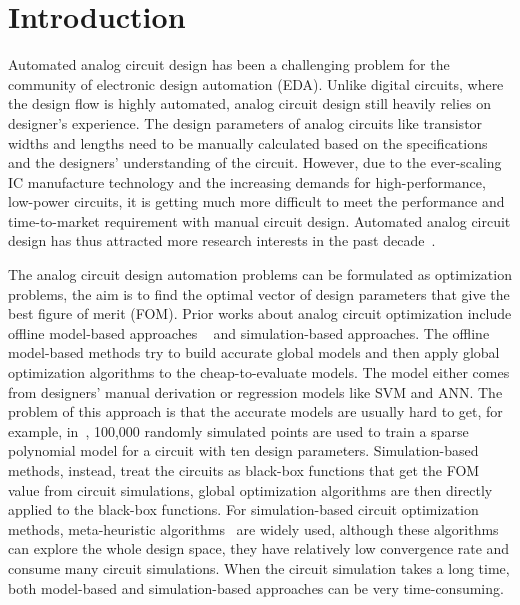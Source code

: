 \section{Introduction}

Automated analog circuit design has been a challenging problem for the
community of electronic design automation (EDA). Unlike digital circuits, where
the design flow is highly automated, analog circuit design still
heavily relies on designer's experience. The design parameters of analog circuits like
transistor widths and lengths need to be manually calculated based on the
specifications and the designers' understanding of the circuit. However, due to
the ever-scaling IC manufacture technology and the increasing demands for
high-performance, low-power circuits, it is getting much more difficult to meet
the performance and time-to-market requirement with manual circuit design.
Automated analog circuit design has thus attracted more research interests in
the past decade~\cite{rutenbar2007hierarchical}.

The analog circuit design automation problems can be formulated as optimization
problems, the aim is to find the optimal vector of design parameters that give
the best figure of merit (FOM). Prior works about analog circuit optimization
include offline model-based approaches
~\cite{colleran2003optimization,daems2003simulation,wang2014enabling} and
simulation-based approaches. The offline model-based methods try to build
accurate global models and then apply global optimization algorithms to the
cheap-to-evaluate models. The model either comes from designers' manual
derivation or regression models like SVM and ANN. The problem of this approach
is that the accurate models are usually hard to get, for example,
in~\cite{wang2014enabling}, 100,000 randomly simulated points are used to train
a sparse polynomial model for a circuit with ten design parameters.
Simulation-based methods, instead, treat the circuits as black-box functions
that get the FOM value from circuit simulations, global optimization algorithms
are then directly applied to the black-box functions. For simulation-based
circuit optimization methods, meta-heuristic
algorithms~\cite{phelps2000anaconda, liu2009analog} are widely used, although
these algorithms can explore the whole design space, they have relatively low
convergence rate and consume many circuit simulations. When the circuit
simulation takes a long time, both model-based and simulation-based approaches
can be very time-consuming.

